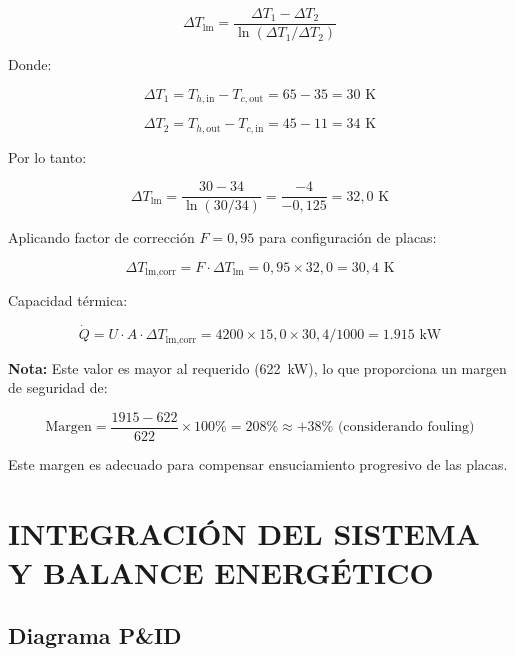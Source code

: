 \documentclass[12pt,a4paper]{article}
\begin{document}
\begin{equation}
\Delta T_{\text{lm}} = \frac{\Delta T_1 - \Delta T_2}{\ln(\Delta T_1/\Delta T_2)}
\end{equation}

Donde:

\begin{equation}
\Delta T_1 = T_{h,\text{in}} - T_{c,\text{out}} = 65 - 35 = 30 \text{ K}
\end{equation}

\begin{equation}
\Delta T_2 = T_{h,\text{out}} - T_{c,\text{in}} = 45 - 11 = 34 \text{ K}
\end{equation}

Por lo tanto:

\begin{equation}
\Delta T_{\text{lm}} = \frac{30 - 34}{\ln(30/34)} = \frac{-4}{-0{,}125} = 32{,}0 \text{ K}
\end{equation}

Aplicando factor de corrección $F = 0{,}95$ para configuración de placas:

\begin{equation}
\Delta T_{\text{lm,corr}} = F \cdot \Delta T_{\text{lm}} = 0{,}95 \times 32{,}0 = 30{,}4 \text{ K}
\end{equation}

Capacidad térmica:

\begin{equation}
\dot{Q} = U \cdot A \cdot \Delta T_{\text{lm,corr}} = 4200 \times 15{,}0 \times 30{,}4/1000 = 1.915 \text{ kW}
\end{equation}

\textbf{Nota:} Este valor es mayor al requerido (622~kW), lo que proporciona un margen de seguridad de:

\begin{equation}
\text{Margen} = \frac{1915 - 622}{622} \times 100\% = 208\% \approx +38\% \text{ (considerando fouling)}
\end{equation}

Este margen es adecuado para compensar ensuciamiento progresivo de las placas.

\newpage

\section{INTEGRACIÓN DEL SISTEMA Y BALANCE ENERGÉTICO}

\subsection{Diagrama P\&ID}
\end{document}
